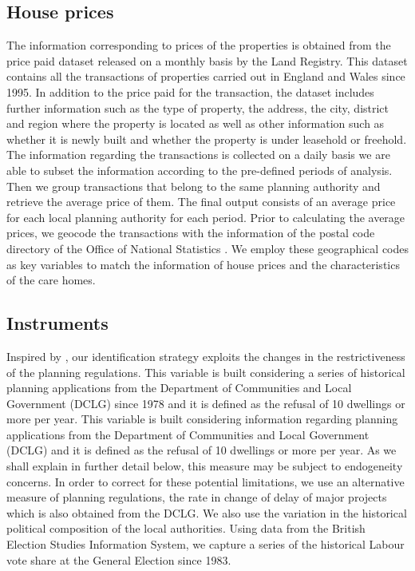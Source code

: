 \documentclass[12pt,letterpaper]{article}
\begin{document}
\subsection*{House prices}
\label{sec: house prices}


   The information corresponding to prices of the properties is obtained from the price paid dataset
    released on a monthly basis by the Land Registry. This dataset contains all the transactions of
     properties carried out in England and Wales since 1995.  In addition to the price paid for the transaction,
    the dataset includes further information such as the type of property, the address, the city, district
     and region where the property is located as well as other information such as whether it is newly built
     and whether the property is under leasehold or freehold. The information regarding the transactions is
     collected on a daily basis we are able to subset the information according to the pre-defined periods of
     analysis. Then we group transactions that belong to the same planning authority and retrieve the average 
     price of them. The final output consists of an average price for each local planning authority for each
    period.  Prior to calculating the average prices, we geocode the transactions with the information of the postal code
    directory of the Office of National Statistics \cite{ons2016}.  We employ these
     geographical codes as key variables to match the information of house prices and the characteristics
      of the care homes. 
     
    
\subsection*{Instruments}

Inspired by \citet{hilber2016supply}, our identification strategy exploits the changes in the restrictiveness of the 
planning regulations. This variable is built considering a series of historical
  planning applications from the Department of Communities and Local Government (DCLG) 
  since 1978 and it is defined as the refusal of 10 dwellings or more per year. This variable is built considering
    information regarding planning applications from the Department of Communities and Local 
    Government (DCLG) and it is defined as the refusal of 10 dwellings or more per year. As we shall explain in further detail 
    below, this measure may be subject to endogeneity concerns. In order to correct for 
    these potential limitations, we use an alternative measure 
    of planning regulations, the rate in change of delay of major projects which is also obtained from the DCLG. We
    also use the variation in the historical 
    political composition of the local authorities. Using data from the British Election Studies Information System, 
    we capture a series of the historical Labour vote share at the General Election since 1983.
   
\end{document}
